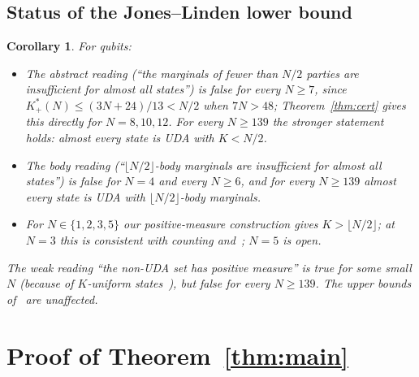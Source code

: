 \documentclass[aps,pra,onecolumn,superscriptaddress,nofootinbib,longbibliography,10pt]{revtex4-2}
\newtheorem{corollary}[proposition]{Corollary}
\theoremstyle{definition}
\newcommand{\Kp}{K^{*}_{+}}
\begin{document}
\subsection{Status of the Jones--Linden lower bound}
\begin{corollary}\label{cor:JL}
For qubits:
\begin{itemize}
\item The abstract reading (``the marginals of fewer than $N/2$ parties are insufficient for almost all states'') is false for every $N\ge7$, since $\Kp(N)\le(3N+24)/13<N/2$ when $7N>48$; Theorem~\ref{thm:cert} gives this directly for $N=8,10,12$. For every $N\ge139$ the stronger statement holds: almost every state is UDA with $K<N/2$.
\item The body reading (``$\lfloor N/2\rfloor$-body marginals are insufficient for almost all states'') is false for $N=4$ and every $N\ge6$, and for every $N\ge139$ almost every state is UDA with $\lfloor N/2\rfloor$-body marginals.
\item For $N\in\{1,2,3,5\}$ our positive-measure construction gives $K>\lfloor N/2\rfloor$; at $N=3$ this is consistent with counting and~\cite{LPW02}; $N=5$ is open.
\end{itemize}
The weak reading ``the non-UDA set has positive measure'' is true for some small $N$ (because of $K$-uniform states~\cite{HG16}), but false for every $N\ge139$. The upper bounds of~\cite{JL05,HCLZ18} are unaffected.
\end{corollary}

\section{Proof of Theorem~\ref{thm:main}}\label{sec:proof1}
\end{document}
